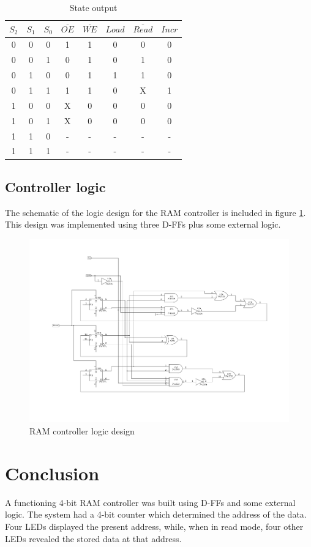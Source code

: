 \documentclass[11pt]{article}
\begin{document}
\begin{table}
	\centering
		\begin{tabular}{c c c | c c c c c }
			$S_2$ & $S_1$ & $S_0$ & $\overline{OE}$ & $\overline{WE}$ & $Load$ & $\overline{Read}$ & $Incr$\\
			\hline
			0 & 0 & 0 & 1 & 1 & 0 & 0 & 0 \\
			0 & 0 & 1 & 0 & 1 & 0 & 1 & 0 \\
			0 & 1 & 0 & 0 & 1 & 1 & 1 & 0 \\
			0 & 1 & 1 & 1 & 1 & 0 & X & 1 \\
			1 & 0 & 0 & X & 0 & 0 & 0 & 0 \\
			1 & 0 & 1 & X & 0 & 0 & 0 & 0 \\
			1 & 1 & 0 & - & - & - & - & - \\
			1 & 1 & 1 & - & - & - & - & - \\
		\end{tabular}
	\caption{State output}
	\label{table:state_output}
\end{table}

\subsection{Controller logic}

The schematic of the logic design for the RAM controller is included in figure \ref{fig:schematic}. This design was implemented using three D-FFs plus some external logic.

\begin{figure}[htpb]
	\centering
	\includegraphics[scale=0.5]{controller.pdf}
	\caption{RAM controller logic design}
	\label{fig:schematic}
\end{figure}


\section{Conclusion}

A functioning 4-bit RAM controller was built using D-FFs and some external logic. The system had a 4-bit counter which determined the address of the data. Four LEDs displayed the present address, while, when in read mode, four other LEDs revealed the stored data at that address. 
\end{document}
